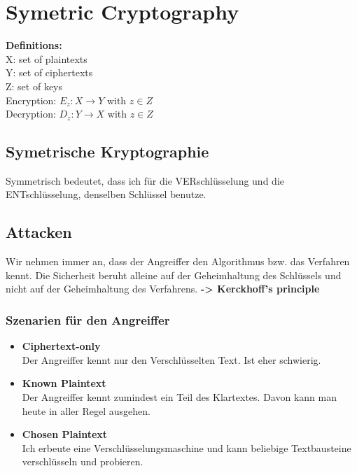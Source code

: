 \hypertarget{symetric-cryptography}{%
\section{Symetric Cryptography}\label{symetric-cryptography}}

\textbf{Definitions:} \\
X: set of plaintexts \\
Y: set of ciphertexts \\
Z: set of keys \\
Encryption: $E_z: X \xrightarrow{} Y$ with $z \in Z$ \\
Decryption: $D_z: Y \xrightarrow{} X$ with $z \in Z$\\

\hypertarget{symetrische-kryptographie}{%
\subsection{Symetrische Kryptographie}\label{symetrische-kryptographie}}

\begin{tcolorbox}[colback=red!5!white,colframe=red!75!black]
Symmetrisch bedeutet, dass ich für die VERschlüsselung und die ENTschlüsselung, denselben Schlüssel benutze. 
\end{tcolorbox}

\hypertarget{attacken}{%
\subsection{Attacken}\label{attacken}}

\begin{tcolorbox}[colback=red!5!white,colframe=red!75!black]
Wir nehmen immer an, dass der Angreiffer den Algorithmus bzw. das Verfahren kennt. 
Die Sicherheit beruht alleine auf der Geheimhaltung des Schlüssels und nicht auf der Geheimhaltung des Verfahrens.
\textbf{-> Kerckhoff's principle}
\end{tcolorbox}

\hypertarget{szenarien-fuxfcr-den-angreiffer}{%
\subsubsection{Szenarien für den Angreiffer}\label{szenarien-fuxfcr-den-angreiffer}}

\begin{itemize}
\tightlist
\item
  \textbf{Ciphertext-only}\\
  Der Angreiffer kennt nur den Verschlüsselten Text. Ist eher schwierig.
\item
  \textbf{Known Plaintext}\\
  Der Angreiffer kennt zumindest ein Teil des Klartextes. Davon kann man
  heute in aller Regel ausgehen.
\item
  \textbf{Chosen Plaintext}\\
  Ich erbeute eine Verschlüsselungsmaschine und kann beliebige
  Textbausteine verschlüsseln und probieren.
\end{itemize}

